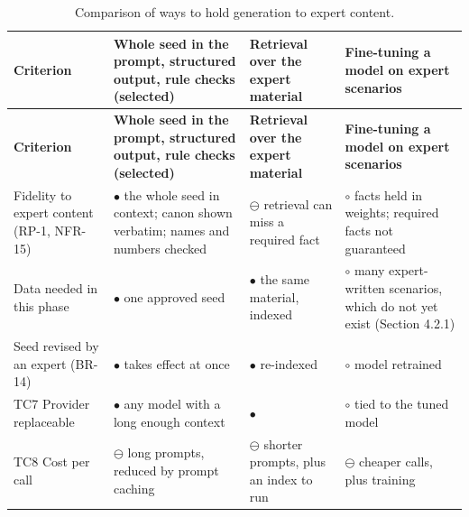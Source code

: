 {\small
\begin{longtable}{|>{\raggedright\arraybackslash}p{}|>{\raggedright\arraybackslash}p{}|>{\raggedright\arraybackslash}p{}|>{\raggedright\arraybackslash}p{}|}
\caption{Comparison of ways to hold generation to expert content.} \\
\hline
\textbf{Criterion} & \textbf{Whole seed in the prompt, structured output, rule checks (selected)} & \textbf{Retrieval over the expert material} & \textbf{Fine-tuning a model on expert scenarios} \\ \hline
\endfirsthead
\hline
\textbf{Criterion} & \textbf{Whole seed in the prompt, structured output, rule checks (selected)} & \textbf{Retrieval over the expert material} & \textbf{Fine-tuning a model on expert scenarios} \\ \hline
\endhead
Fidelity to expert content (RP-1, NFR-15) & $\bullet$ the whole seed in context; canon shown verbatim; names and numbers checked\cite{r120,r121} & $\ominus$ retrieval can miss a required fact & $\circ$ facts held in weights; required facts not guaranteed \\ \hline
Data needed in this phase & $\bullet$ one approved seed & $\bullet$ the same material, indexed & $\circ$ many expert-\allowbreak{}written scenarios, which do not yet exist (Section 4.2.1) \\ \hline
Seed revised by an expert (BR-14) & $\bullet$ takes effect at once & $\bullet$ re-indexed & $\circ$ model retrained \\ \hline
TC7 Provider replaceable & $\bullet$ any model with a long enough context & $\bullet$ & $\circ$ tied to the tuned model \\ \hline
TC8 Cost per call & $\ominus$ long prompts, reduced by prompt caching & $\ominus$ shorter prompts, plus an index to run & $\ominus$ cheaper calls, plus training \\ \hline
\end{longtable}
}

